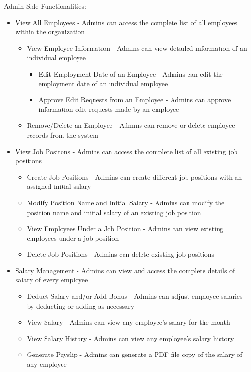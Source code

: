 \documentclass[journal]{./IEEE/IEEEtran}
\begin{document}
	Admin-Side Functionalities:
    \begin{itemize}
        \item View All Employees - Admins can access the complete list of all employees within the organization
    \begin{itemize}
        \item View Employee Information - Admins can view detailed information of an individual employee
    \begin{itemize}
        \item Edit Employment Date of an Employee - Admins can edit the employment date of an individual employee
        \item Approve Edit Requests from an Employee - Admins can approve information edit requests made by an employee
    \end{itemize}
    \item Remove/Delete an Employee - Admins can remove or delete employee records from the system
    \end{itemize}
    \item View Job Positons - Admins can access the complete list of all existing job positions
    \begin{itemize}
        \item Create Job Positions - Admins can create different job positions with an assigned initial salary
        \item Modify Position Name and Initial Salary - Admins can modify the position name and initial salary of an existing job position    
        \item View Employees Under a Job Position - Admins can view existing employees under a job position
        \item Delete Job Positions - Admins can delete existing job positions 
    \end{itemize}
    \item Salary Management - Admins can view and access the complete details of salary of every employee
    \begin{itemize}
        \item Deduct Salary and/or Add Bonus - Admins can adjust employee salaries by deducting or adding as necessary
        \item View Salary - Admins can view any employee's salary for the month
        \item View Salary History - Admins can view any employee's salary history
        \item Generate Payslip - Admins can generate a PDF file copy of the salary of any employee

\end{itemize}
\end{itemize}
\end{document}
